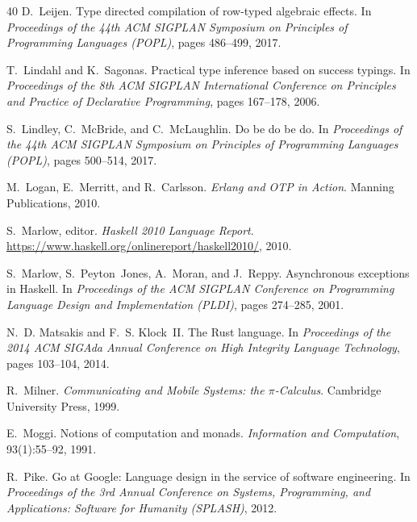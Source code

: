 \documentclass[11pt,twocolumn]{article}
\begin{document}
\begin{thebibliography}{40}
D.~Leijen.
\newblock Type directed compilation of row-typed algebraic effects.
\newblock In \emph{Proceedings of the 44th ACM SIGPLAN Symposium on Principles of Programming Languages (POPL)}, pages 486--499, 2017.

T.~Lindahl and K.~Sagonas.
\newblock Practical type inference based on success typings.
\newblock In \emph{Proceedings of the 8th ACM SIGPLAN International Conference on Principles and Practice of Declarative Programming}, pages 167--178, 2006.

S.~Lindley, C.~McBride, and C.~McLaughlin.
\newblock Do be do be do.
\newblock In \emph{Proceedings of the 44th ACM SIGPLAN Symposium on Principles of Programming Languages (POPL)}, pages 500--514, 2017.

M.~Logan, E.~Merritt, and R.~Carlsson.
\newblock \emph{Erlang and OTP in Action}.
\newblock Manning Publications, 2010.

S.~Marlow, editor.
\newblock \emph{Haskell 2010 Language Report}.
\newblock \url{https://www.haskell.org/onlinereport/haskell2010/}, 2010.

S.~Marlow, S.~Peyton~Jones, A.~Moran, and J.~Reppy.
\newblock Asynchronous exceptions in Haskell.
\newblock In \emph{Proceedings of the ACM SIGPLAN Conference on Programming Language Design and Implementation (PLDI)}, pages 274--285, 2001.

N.~D. Matsakis and F.~S. Klock~II.
\newblock The Rust language.
\newblock In \emph{Proceedings of the 2014 ACM SIGAda Annual Conference on High Integrity Language Technology}, pages 103--104, 2014.

R.~Milner.
\newblock \emph{Communicating and Mobile Systems: the $\pi$-Calculus}.
\newblock Cambridge University Press, 1999.

E.~Moggi.
\newblock Notions of computation and monads.
\newblock \emph{Information and Computation}, 93(1):55--92, 1991.

R.~Pike.
\newblock Go at Google: Language design in the service of software engineering.
\newblock In \emph{Proceedings of the 3rd Annual Conference on Systems, Programming, and Applications: Software for Humanity (SPLASH)}, 2012.


\end{thebibliography}
\end{document}
